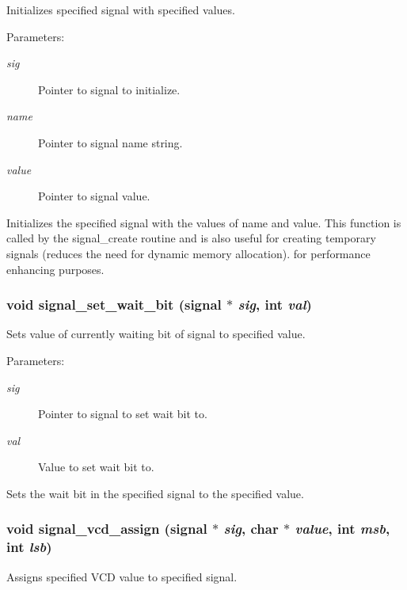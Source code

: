 Initializes specified signal with specified values. 

\begin{Desc}
\item[Parameters:]
\begin{description}
\item[{\em sig}]Pointer to signal to initialize. \item[{\em name}]Pointer to signal name string. \item[{\em value}]Pointer to signal value.\end{description}
\end{Desc}
Initializes the specified signal with the values of name and value. This function is called by the signal\_\-create routine and is also useful for creating temporary signals (reduces the need for dynamic memory allocation). for performance enhancing purposes. 
\subsubsection{\setlength{\rightskip}{0pt plus 5cm}void signal\_\-set\_\-wait\_\-bit ({\bf signal} $\ast$ {\em sig}, int {\em val})}\label{signal_8c_a7}


Sets value of currently waiting bit of signal to specified value. 

\begin{Desc}
\item[Parameters:]
\begin{description}
\item[{\em sig}]Pointer to signal to set wait bit to. \item[{\em val}]Value to set wait bit to.\end{description}
\end{Desc}
Sets the wait bit in the specified signal to the specified value. 
\subsubsection{\setlength{\rightskip}{0pt plus 5cm}void signal\_\-vcd\_\-assign ({\bf signal} $\ast$ {\em sig}, char $\ast$ {\em value}, int {\em msb}, int {\em lsb})}\label{signal_8c_a9}


Assigns specified VCD value to specified signal. 

